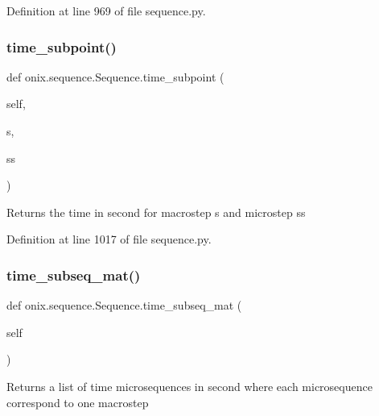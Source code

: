 Definition at line 969 of file sequence.\+py.

\mbox{\label{classonix_1_1sequence_1_1Sequence_a8fc0911f2e6309f2028885f585a9d36a}} 
\subsubsection{\texorpdfstring{time\+\_\+subpoint()}{time\_subpoint()}}
{\footnotesize\ttfamily def onix.\+sequence.\+Sequence.\+time\+\_\+subpoint (\begin{DoxyParamCaption}\item[{}]{self,  }\item[{}]{s,  }\item[{}]{ss }\end{DoxyParamCaption})}

\begin{DoxyVerb}Returns the time in second for macrostep s and microstep ss
\end{DoxyVerb}
 

Definition at line 1017 of file sequence.\+py.

\mbox{\label{classonix_1_1sequence_1_1Sequence_ae9b0583c1a97a3587f6a3e1e0b04651e}} 
\subsubsection{\texorpdfstring{time\+\_\+subseq\+\_\+mat()}{time\_subseq\_mat()}\hspace{0.1cm}{\footnotesize\ttfamily [1/2]}}
{\footnotesize\ttfamily def onix.\+sequence.\+Sequence.\+time\+\_\+subseq\+\_\+mat (\begin{DoxyParamCaption}\item[{}]{self }\end{DoxyParamCaption})}

\begin{DoxyVerb}Returns a list of time microsequences in second where each microsequence correspond 
to one macrostep
\end{DoxyVerb}
 

